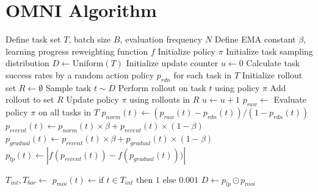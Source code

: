 \documentclass{article} %
\begin{document}
\section{OMNI Algorithm}
\label{app:pseudocode}
\begin{algorithm}[H]
\caption{OMNI Algorithm}
\begin{algorithmic}
\State Define task set $T$, batch size $B$, evaluation frequency $N$
\State Define EMA constant $\beta$, learning progress reweighting function $f$
\State Initialize policy $\pi$
\State Initialize task sampling distribution $D \gets \text{Uniform}(T)$
\State Initialize update counter $u \gets 0$
\State Calculate task success rates by a random action policy $p_{rdn}$ for each task in $T$
    \State Initialize rollout set $R \gets \emptyset$
        \State Sample task $t \sim D$ 
        \State Perform rollout on task $t$ using policy $\pi$
        \State Add rollout to set $R$
    \EndWhile
    \State Update policy $\pi$ using rollouts in $R$ 
    \State $u \gets u + 1$
        \State $p_{raw} \gets$ Evaluate policy $\pi$ on all tasks in $T$
            \State $p_{norm}(t) \gets (p_{raw}(t) - p_{rdn}(t)) / (1 - p_{rdn}(t))$ 
            \State $p_{recent}(t) \gets p_{norm}(t) \times \beta + p_{recent}(t) \times (1 - \beta)$
            \State $p_{gradual}(t) \gets p_{recent}(t) \times \beta + p_{gradual}(t) \times (1 - \beta)$
            \State $p_{lp}(t) \gets |f(p_{recent}(t)) - f(p_{gradual}(t)))|$ 
        \EndFor

        \State $T_{int}, T_{bor} \gets$  
            \State $p_{moi}(t) \gets \text{if } t \in T_{int} \text{ then } 1 \text{ else } 0.001$ 
        \EndFor
        \State $D \gets p_{lp} \odot p_{moi}$ 
    \EndIf
\EndWhile
\end{algorithmic}
\end{algorithm}
\end{document}
